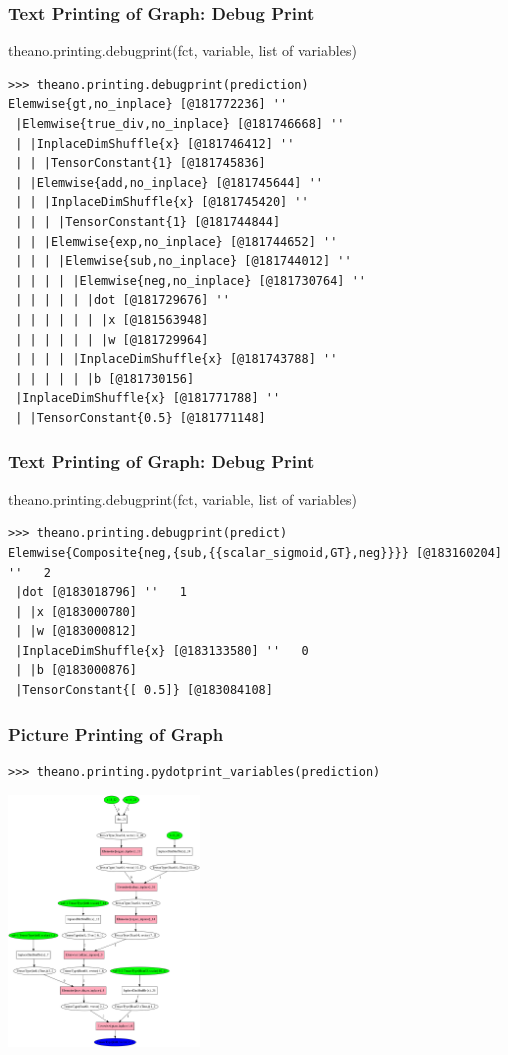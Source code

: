 \documentclass[a4paper,9pt]{beamer}
\begin{document}
\begin{frame}[fragile]
\frametitle{Text Printing of Graph: Debug Print}
theano.printing.debugprint({fct, variable, list of variables})
\vfill
\small
\begin{Verbatim}
>>> theano.printing.debugprint(prediction)
Elemwise{gt,no_inplace} [@181772236] ''   
 |Elemwise{true_div,no_inplace} [@181746668] ''   
 | |InplaceDimShuffle{x} [@181746412] ''   
 | | |TensorConstant{1} [@181745836]
 | |Elemwise{add,no_inplace} [@181745644] ''   
 | | |InplaceDimShuffle{x} [@181745420] ''   
 | | | |TensorConstant{1} [@181744844]
 | | |Elemwise{exp,no_inplace} [@181744652] ''   
 | | | |Elemwise{sub,no_inplace} [@181744012] ''   
 | | | | |Elemwise{neg,no_inplace} [@181730764] ''   
 | | | | | |dot [@181729676] ''   
 | | | | | | |x [@181563948]
 | | | | | | |w [@181729964]
 | | | | |InplaceDimShuffle{x} [@181743788] ''   
 | | | | | |b [@181730156]
 |InplaceDimShuffle{x} [@181771788] ''   
 | |TensorConstant{0.5} [@181771148]
\end{Verbatim}
\end{frame}

\begin{frame}[fragile]
\frametitle{Text Printing of Graph: Debug Print}
theano.printing.debugprint({fct, variable, list of variables})
\vfill
\small
\begin{Verbatim}
>>> theano.printing.debugprint(predict)
Elemwise{Composite{neg,{sub,{{scalar_sigmoid,GT},neg}}}} [@183160204] ''   2
 |dot [@183018796] ''   1
 | |x [@183000780]
 | |w [@183000812]
 |InplaceDimShuffle{x} [@183133580] ''   0
 | |b [@183000876]
 |TensorConstant{[ 0.5]} [@183084108]
\end{Verbatim}
\end{frame}

\begin{frame}[fragile]
\frametitle{Picture Printing of Graph}
\begin{Verbatim}
>>> theano.printing.pydotprint_variables(prediction)
\end{Verbatim}
\includegraphics[width=2.0in]{pics/logreg_pydotprint_prediction.png}
\end{frame}
\end{document}
